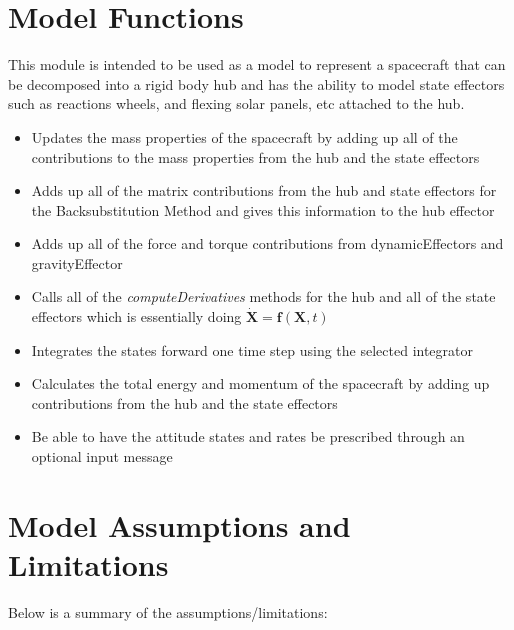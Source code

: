 \section{Model Functions}

This module is intended to be used as a model to represent a spacecraft that can be decomposed into a rigid body hub and has the ability to model state effectors such as reactions wheels, and flexing solar panels, etc attached to the hub.

\begin{itemize}
	\item Updates the mass properties of the spacecraft by adding up all of the contributions to the mass properties from the hub and the state effectors
	\item Adds up all of the matrix contributions from the hub and state effectors for the Backsubstitution Method and gives this information to the hub effector
	\item Adds up all of the force and torque contributions from dynamicEffectors and gravityEffector
	\item Calls all of the \textit{computeDerivatives} methods for the hub and all of the state effectors which is essentially doing $\dot{\bm X} = \bm f(\bm X, t)$
	\item Integrates the states forward one time step using the selected integrator
	\item Calculates the total energy and momentum of the spacecraft by adding up contributions from the hub and the state effectors
	\item Be able to have the attitude states and rates be prescribed through an optional input message
\end{itemize}

\section{Model Assumptions and Limitations}
Below is a summary of the assumptions/limitations:

